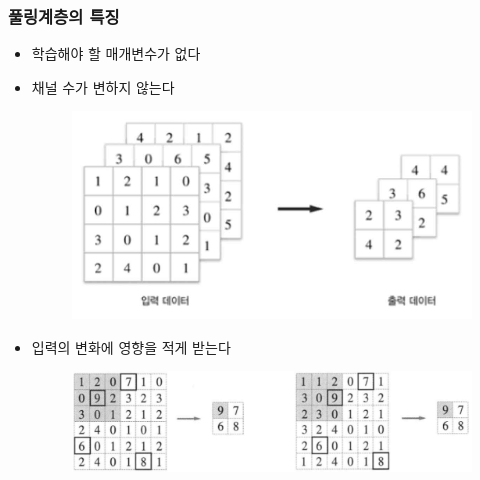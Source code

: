 \documentclass{beamer}
\begin{document}
\begin{frame}
	\frametitle{풀링계층의 특징}
		\begin{itemize}
			\item 학습해야 할 매개변수가 없다
			\item 채널 수가 변하지 않는다
			\begin{figure}
				\includegraphics[width=0.5\columnwidth]{../Figure/Figure_11.pdf}
			\end{figure}
			\item 입력의 변화에 영향을 적게 받는다
			\begin{figure}
				\includegraphics[width=0.5\columnwidth]{../Figure/Figure_12.pdf}
			\end{figure}
		\end{itemize}
\end{frame}

\end{document}
